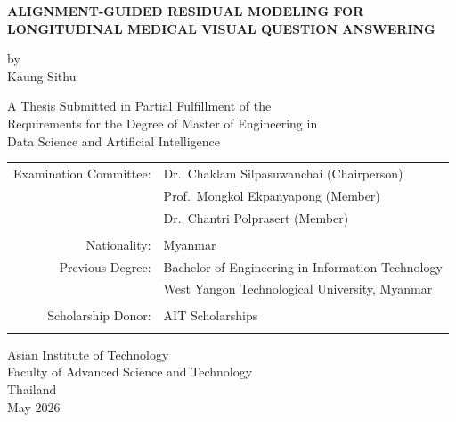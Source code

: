 \begin{center}
	\large\textbf{ALIGNMENT-GUIDED RESIDUAL MODELING FOR LONGITUDINAL MEDICAL VISUAL QUESTION ANSWERING}
	
	\vspace{2em}
	by\\
	\vspace{2em}
	Kaung Sithu
	\vspace{2em}
	
	A Thesis Submitted in Partial Fulfillment of the\\
	Requirements for the Degree of Master of Engineering in\\
	Data Science and Artificial Intelligence
	
	\vspace{2em}
	
	\begin{tabular}{rl}
		\\[-1em]
		Examination Committee: & Dr.\ Chaklam Silpasuwanchai (Chairperson) \\
		& Prof.\ Mongkol Ekpanyapong (Member) \\
		& Dr.\ Chantri Polprasert (Member) \\
		\\
		Nationality:     & Myanmar \\
		Previous Degree: & Bachelor of Engineering in Information Technology\\
		& West Yangon Technological University, Myanmar \\
		\\
		Scholarship Donor: & AIT Scholarships\\
		\\
	\end{tabular}
	
	\vfill 
	
	Asian Institute of Technology\\ 
	Faculty of Advanced Science and Technology\\ 
	Thailand\\ 
	May 2026
\end{center}
\clearpage %